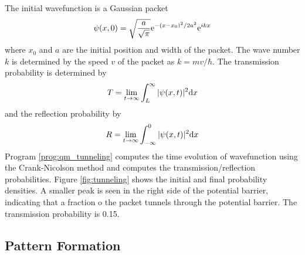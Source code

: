 The initial wavefunction is a Gaussian packet
\begin{equation}
\psi(x,0) = \sqrt{\frac{a}{\sqrt{\pi}}} \text{e}^{-(x-x_0)^2/2 a^2} \text{e}^{i k x} 
\end{equation}
where $x_0$ and $a$ are the initial position and width of the packet.  The wave number $k$ is determined by the speed $v$ of the packet as
$k=m v /\hbar$.  The transmission probability is determined by
\begin{equation}
T = \lim_{t \rightarrow \infty} \int_L^\infty |\psi(x,t)|^2 \text{d} x
\end{equation}
and the reflection probability by
\begin{equation}
R = \lim_{t \rightarrow \infty} \int_{-\infty}^0 |\psi(x,t)|^2 \text{d} x
\end{equation}
Program \ref{prog:qm_tunneling} computes the time evolution of wavefunction using the Crank-Nicolson method and computes the transmission/reflection probabilities.  Figure \ref{fig:tunneling}  shows the initial and final probability densities. A smaller peak is seen in the right side of the potential barrier, indicating that a fraction o the packet tunnels through the potential barrier. The transmission probability is 0.15.

\subsection{Pattern Formation}

